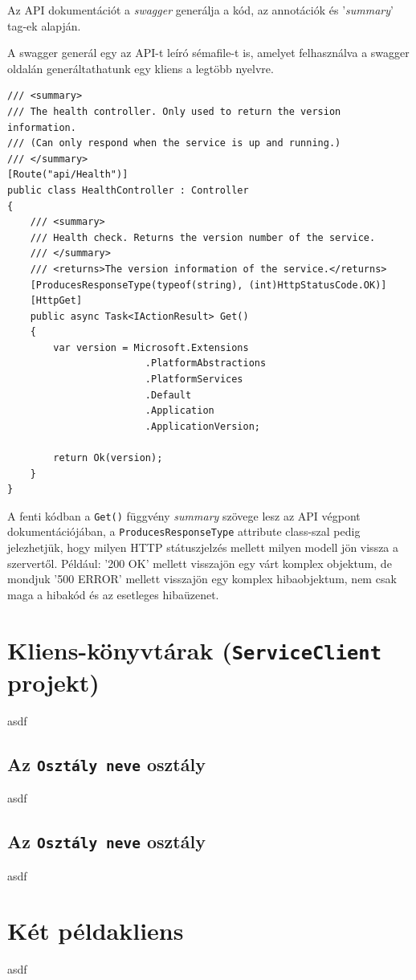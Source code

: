\documentclass[twoside, a4paper, 12pt]{book}
\begin{document}
Az API dokumentációt a \textit{swagger}\cite{swaggerHomepage} generálja a kód, az annotációk és '\textit{summary}' tag-ek alapján.

A swagger generál egy az API-t leíró sémafile-t is, amelyet felhasználva a swagger oldalán generáltathatunk egy kliens a legtöbb nyelvre.

\begin{lstlisting}[caption=Health-check példakód 'summary' tag-ekkel., label=lst:healtcheck]
/// <summary>
/// The health controller. Only used to return the version information.
/// (Can only respond when the service is up and running.)
/// </summary>
[Route("api/Health")]
public class HealthController : Controller
{
	/// <summary>
	/// Health check. Returns the version number of the service.
	/// </summary>
	/// <returns>The version information of the service.</returns>
	[ProducesResponseType(typeof(string), (int)HttpStatusCode.OK)]
	[HttpGet]
	public async Task<IActionResult> Get()
	{
		var version = Microsoft.Extensions
						.PlatformAbstractions
						.PlatformServices
						.Default
						.Application
						.ApplicationVersion;

		return Ok(version);
	}
}
\end{lstlisting}

A fenti kódban a \texttt{Get()} függvény \textit{summary} szövege lesz az API végpont dokumentációjában, a \texttt{ProducesResponseType} attribute class-szal pedig jelezhetjük, hogy milyen HTTP státuszjelzés mellett milyen modell jön vissza a szervertől. Például: '200 OK' mellett visszajön egy várt komplex objektum, de mondjuk '500 ERROR' mellett visszajön egy komplex hibaobjektum, nem csak maga a hibakód és az esetleges hibaüzenet.

\section{Kliens-könyvtárak (\texttt{ServiceClient} projekt)}
asdf
\subsection{Az \texttt{Osztály neve} osztály}
asdf
\subsection{Az \texttt{Osztály neve} osztály}
asdf

\section{Két példakliens}
asdf
\end{document}
